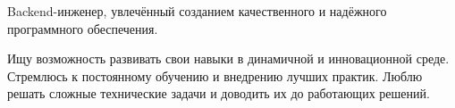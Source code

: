 \par{
Backend-инженер, увлечённый созданием качественного и надёжного программного обеспечения.

Ищу возможность развивать свои навыки в динамичной и инновационной среде. Стремлюсь к постоянному обучению и внедрению лучших практик. Люблю решать сложные технические задачи и доводить их до работающих решений.
}
\vspace{1em}
